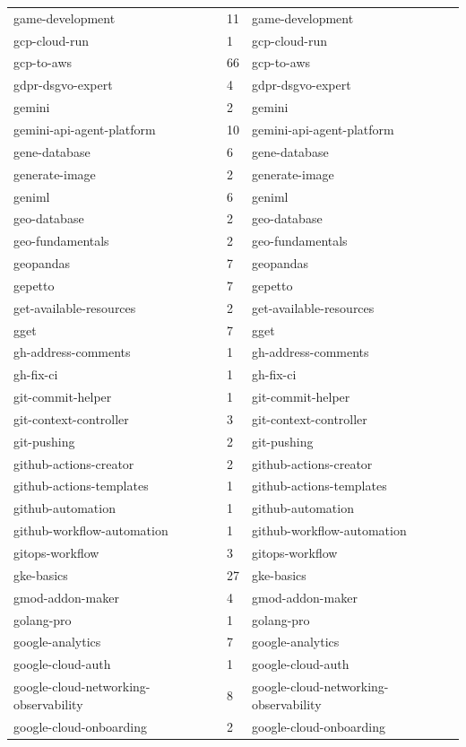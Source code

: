 \begin{longtable}{@{}lll@{}}
game-development & 11 & game-development\\
gcp-cloud-run & 1 & gcp-cloud-run\\
gcp-to-aws & 66 & gcp-to-aws\\
gdpr-dsgvo-expert & 4 & gdpr-dsgvo-expert\\
gemini & 2 & gemini\\
gemini-api-agent-platform & 10 & gemini-api-agent-platform\\
gene-database & 6 & gene-database\\
generate-image & 2 & generate-image\\
geniml & 6 & geniml\\
geo-database & 2 & geo-database\\
geo-fundamentals & 2 & geo-fundamentals\\
geopandas & 7 & geopandas\\
gepetto & 7 & gepetto\\
get-available-resources & 2 & get-available-resources\\
gget & 7 & gget\\
gh-address-comments & 1 & gh-address-comments\\
gh-fix-ci & 1 & gh-fix-ci\\
git-commit-helper & 1 & git-commit-helper\\
git-context-controller & 3 & git-context-controller\\
git-pushing & 2 & git-pushing\\
github-actions-creator & 2 & github-actions-creator\\
github-actions-templates & 1 & github-actions-templates\\
github-automation & 1 & github-automation\\
github-workflow-automation & 1 & github-workflow-automation\\
gitops-workflow & 3 & gitops-workflow\\
gke-basics & 27 & gke-basics\\
gmod-addon-maker & 4 & gmod-addon-maker\\
golang-pro & 1 & golang-pro\\
google-analytics & 7 & google-analytics\\
google-cloud-auth & 1 & google-cloud-auth\\
google-cloud-networking-observability & 8 & google-cloud-networking-observability\\
google-cloud-onboarding & 2 & google-cloud-onboarding\\

\end{longtable}
